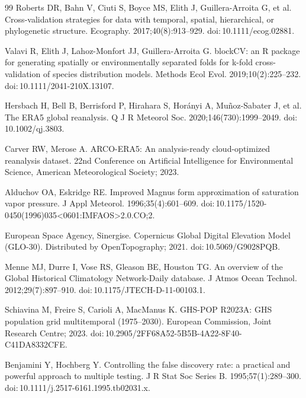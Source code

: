 \documentclass[11pt,a4paper]{article}
\begin{document}
\begin{thebibliography}{99}
 Roberts DR, Bahn V, Ciuti S, Boyce MS, Elith J, Guillera-Arroita G, et al. Cross-validation strategies for data with temporal, spatial, hierarchical, or phylogenetic structure. Ecography. 2017;40(8):913--929. doi:\,10.1111/ecog.02881.

 Valavi R, Elith J, Lahoz-Monfort JJ, Guillera-Arroita G. blockCV: an R package for generating spatially or environmentally separated folds for k-fold cross-validation of species distribution models. Methods Ecol Evol. 2019;10(2):225--232. doi:\,10.1111/2041-210X.13107.

 Hersbach H, Bell B, Berrisford P, Hirahara S, Hor\'anyi A, Mu\~noz-Sabater J, et al. The ERA5 global reanalysis. Q J R Meteorol Soc. 2020;146(730):1999--2049. doi:\,10.1002/qj.3803.

 Carver RW, Merose A. ARCO-ERA5: An analysis-ready cloud-optimized reanalysis dataset. 22nd Conference on Artificial Intelligence for Environmental Science, American Meteorological Society; 2023.

 Alduchov OA, Eskridge RE. Improved Magnus form approximation of saturation vapor pressure. J Appl Meteorol. 1996;35(4):601--609. doi:\,10.1175/1520-0450(1996)035<0601:IMFAOS>2.0.CO;2.

 European Space Agency, Sinergise. Copernicus Global Digital Elevation Model (GLO-30). Distributed by OpenTopography; 2021. doi:\,10.5069/G9028PQB.

 Menne MJ, Durre I, Vose RS, Gleason BE, Houston TG. An overview of the Global Historical Climatology Network-Daily database. J Atmos Ocean Technol. 2012;29(7):897--910. doi:\,10.1175/JTECH-D-11-00103.1.

 Schiavina M, Freire S, Carioli A, MacManus K. GHS-POP R2023A: GHS population grid multitemporal (1975--2030). European Commission, Joint Research Centre; 2023. doi:\,10.2905/2FF68A52-5B5B-4A22-8F40-C41DA8332CFE.

 Benjamini Y, Hochberg Y. Controlling the false discovery rate: a practical and powerful approach to multiple testing. J R Stat Soc Series B. 1995;57(1):289--300. doi:\,10.1111/j.2517-6161.1995.tb02031.x.

\end{thebibliography}
\endgroup

\clearpage
\end{document}

